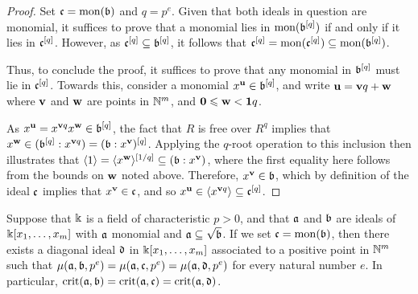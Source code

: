\documentclass{amsart}
\begin{document}
\begin{proof}  Set $\mathfrak{c} = \operatorname{mon}(\mathfrak{b})$ and $q=p^e$.  Given that both ideals in question are monomial, it suffices to prove that a monomial lies in $\operatorname{mon}(\mathfrak{b}^{[q]})$ if and only if it lies in $\mathfrak{c}^{[q]}$.  However, as $\mathfrak{c}^{[q]} \subseteq \mathfrak{b}^{[q]}$, it follows that
$\mathfrak{c}^{[q]} = \operatorname{mon}(\mathfrak{c}^{[q]}) \subseteq \operatorname{mon}(\mathfrak{b}^{[q]})$.

Thus, to conclude the proof, it suffices to prove that any monomial in $\mathfrak{b}^{[q]}$ must lie in $\mathfrak{c}^{[q]}$.  Towards this, consider a monomial $x^{\mathbf{u}} \in \mathfrak{b}^{[q]}$, and write $\mathbf{u} = \mathbf{v}q + \mathbf{w}$ where $\mathbf{v}$ and $\mathbf{w}$ are points in $\mathbb{N}^m$, and $\mathbf{0} \leqslant \mathbf{w} < \mathbf{1}q$.

As $x^{\mathbf{u}} = x^{\mathbf{v}q} x^{\mathbf{w}} \in \mathfrak{b}^{[q]}$, the fact that $R$ is free over $R^q$ implies that $x^{\mathbf{w}} \in ( \mathfrak{b}^{[q]}: x^{\mathbf{v}q}) = (\mathfrak{b}:x^{\mathbf{v}})^{[q]}$.  Applying the $q$-root operation to this inclusion then illustrates that $\langle 1 \rangle = \langle x^{\mathbf{w}} \rangle^{[1/q]}  \subseteq (\mathfrak{b}: x^{\mathbf{v}})$,  where the first equality here follows from the bounds on $\mathbf{w}$ noted above.   Therefore, $x^{\mathbf{v}} \in \mathfrak{b}$, which by definition of the ideal $\mathfrak{c}$ implies that $x^{\mathbf{v}} \in \mathfrak{c}$, and so $x^{\mathbf{u}} \in \langle x^{\mathbf{v}q} \rangle \subseteq \mathfrak{c}^{[q]}$.
\end{proof}


\begin{theorem}
\label{reduce-to-monomial-case: C}
Suppose that $\Bbbk$ is a field of characteristic $p>0$, and that $\mathfrak{a}$ and $\mathfrak{b}$ are ideals of $\Bbbk[x_1, \ldots, x_m]$ with $\mathfrak{a}$ monomial and $\mathfrak{a} \subseteq \sqrt{\mathfrak{b}}$.  If we set $\mathfrak{c} = \operatorname{mon}(\mathfrak{b})$,  then there exists a diagonal ideal $\mathfrak{d}$ in $\Bbbk[x_1, \ldots, x_m]$ associated to a positive point in $\mathbb{N}^m$ such that $\mu(\mathfrak{a}, \mathfrak{b}, p^e) = \mu(\mathfrak{a}, \mathfrak{c}, p^e) = \mu(\mathfrak{a}, \mathfrak{d}, p^e)$ for every natural number $e$.  In particular, $\operatorname{crit}(\mathfrak{a},\mathfrak{b}) = \operatorname{crit}(\mathfrak{a}, \mathfrak{c}) = \operatorname{crit}(\mathfrak{a}, \mathfrak{d})$.
\end{theorem}
\end{document}
